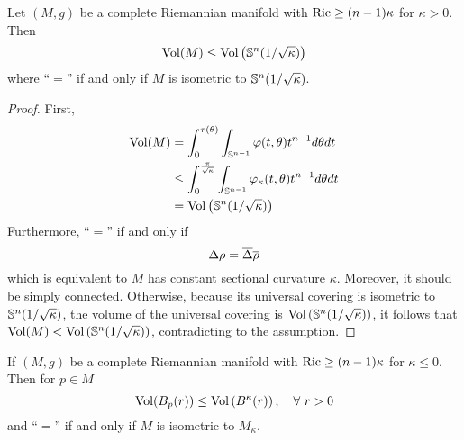 \begin{enumerate}[label=\arabic{*}]
	\begin{cor}[Bishop]
		Let $(M,g)$ be a complete Riemannian manifold with $\operatorname{Ric} \geq (n-1)\kappa$ for $\kappa > 0$. Then
		\begin{equation*}
			\operatorname{Vol}(M) \leq \operatorname{Vol}\left(\mathbb{S}^n(1 / \sqrt{\kappa})\right)
		\end{equation*}
		where ``$=$'' if and only if $M$ is isometric to $\mathbb{S}^n(1 / \sqrt{\kappa})$.
	\end{cor}
	\begin{proof}
		First,
		\begin{equation*}
			\begin{aligned}
				\operatorname{Vol}(M) &= \int_0^{\tau(\theta)} \int_{\mathbb{S}^{n-1}}\varphi(t,\theta) t^{n-1}d\theta dt \\ 
				&\leq  \int_0^{\frac{\pi}{\sqrt{\kappa}}} \int_{\mathbb{S}^{n-1}}\varphi_\kappa(t,\theta) t^{n-1}d\theta dt \\
				&= \operatorname{Vol}\left(\mathbb{S}^n(1 / \sqrt{\kappa})\right) 
			\end{aligned}
		\end{equation*}
		Furthermore, ``$=$'' if and only if 
		\begin{equation*}
			\Delta \rho = \overline{\Delta} \overline{\rho}
		\end{equation*}
		which is equivalent to $M$ has constant sectional curvature $\kappa$. Moreover, it should be simply connected. Otherwise, because its universal covering is isometric to $\mathbb{S}^n(1 / \sqrt{\kappa})$, the volume of the universal covering is $\operatorname{Vol}\left(\mathbb{S}^n(1 / \sqrt{\kappa})\right) $, it follows that $\operatorname{Vol}(M) < \operatorname{Vol}\left(\mathbb{S}^n(1 / \sqrt{\kappa})\right) $, contradicting to the assumption.	 
	\end{proof}
	\begin{rmk}
		If $(M,g)$ be a complete Riemannian manifold with $\operatorname{Ric} \geq (n-1)\kappa$ for $\kappa \leq 0$. Then for $p \in M$
		\begin{equation*}
			\operatorname{Vol}(B_p(r)) \leq \operatorname{Vol}\left(B^\kappa(r)\right),\quad \forall~r>0
		\end{equation*}
		and ``$=$'' if and only if $M$ is isometric to $M_\kappa$.
	\end{rmk}


\end{enumerate}
